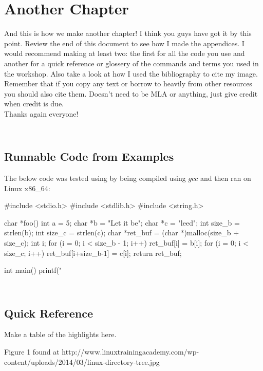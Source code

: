 \documentclass{book}
\begin{document}
\chapter{Another Chapter}
And this is how we make another chapter! I think you guys have got it by this point. Review the end of this document to see how I made the appendices. I would recommend making at least two: the first for all the code you use and another for a quick reference or glossery of the commands and terms you used in the workshop. Also take a look at how I used the bibliography to cite my image. Remember that if you copy any text or borrow to heavily from other resources you should also cite them. Doesn't need to be MLA or anything, just give credit when credit is due. \\

Thanks again everyone!

\newpage
\appendix
\section{\\Runnable Code from Examples} \label{App:AppendixA}
The below code was tested using by being compiled using $gcc$ and then ran on Linux x86\_64: 
\begin{verbatimtab}
#include <stdio.h>
#include <stdlib.h>
#include <string.h>

char *foo(){
	int a = 5;
	char *b = "Let it be";
	char *c = "leed";
	int size_b = strlen(b);
	int size_c = strlen(c);
	char *ret_buf = (char *)malloc(size_b + size_c);
	int i;
	for (i = 0; i < size_b - 1; i++){
	 	ret_buf[i] = b[i];
	}
	for (i = 0; i < size_c; i++){
		ret_buf[i+size_b-1] = c[i];	
	}
	return ret_buf;
}

int main() {
	printf("%
}
\end{verbatimtab}

\newpage
\section{\\Quick Reference} \label{App:AppendixB}

Make a table of the highlights here.

\newpage
\begin{thebibliography}{10}

	 Figure 1 found at http://www.linuxtrainingacademy.com/wp-content/uploads/2014/03/linux-directory-tree.jpg \\

\end{thebibliography}
\end{document}
